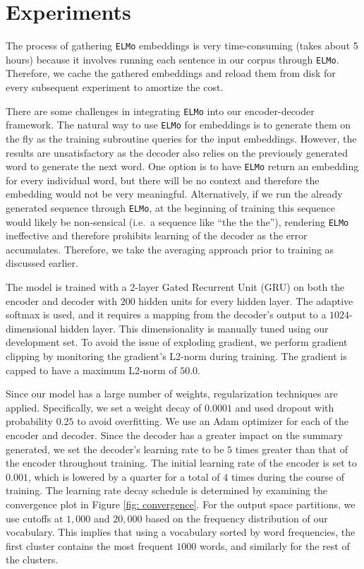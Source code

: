 \section{Experiments}
\label{sec: exp}

The process of gathering \texttt{ELMo} embeddings is very time-consuming (takes about 5 hours) because it involves running each sentence in our corpus through \texttt{ELMo}. Therefore, we cache the gathered embeddings and reload them from disk for every subsequent experiment to amortize the cost. 

There are some challenges in integrating \texttt{ELMo} into our encoder-decoder framework. The natural way to use \texttt{ELMo} for embeddings is to generate them on the fly as the training subroutine queries for the input embeddings. However, the results are unsatisfactory as the decoder also relies on the previously generated word to generate the next word. One option is to have \texttt{ELMo} return an embedding for every individual word, but there will be no context and therefore the embedding would not be very meaningful. Alternatively, if we run the already generated sequence through \texttt{ELMo}, at the beginning of training this sequence would likely be non-sensical (i.e.\ a sequence like ``the the the''), rendering \texttt{ELMo} ineffective and therefore prohibits learning of the decoder as the error accumulates. Therefore, we take the averaging approach prior to training as discussed earlier.

The model is trained with a 2-layer Gated Recurrent Unit (GRU) on both the encoder and decoder with $200$ hidden units for every hidden layer. The adaptive softmax is used, and it requires a mapping from the decoder's output to a $1024$-dimensional hidden layer. This dimensionality is manually tuned using our development set. To avoid the issue of exploding gradient, we perform gradient clipping by monitoring the gradient's L2-norm during training. The gradient is capped to have a maximum L2-norm of $50.0$.

Since our model has a large number of weights, regularization techniques are applied. Specifically, we set a weight decay of $0.0001$ and used dropout with probability $0.25$ to avoid overfitting. We use an Adam optimizer \cite{kingma2014adam} for each of the encoder and decoder. Since the decoder has a greater impact on the summary generated, we set the decoder's learning rate to be $5$ times greater than that of the encoder throughout training. The initial learning rate of the encoder is set to $0.001$, which is lowered by a quarter for a total of $4$ times during the course of training. The learning rate decay schedule is determined by examining the convergence plot in Figure \ref{fig: convergence}. For the output space partitions, we use cutoffs at $1,000$ and $20,000$ based on the frequency distribution of our vocabulary. This implies that using a vocabulary sorted by word frequencies, the first cluster contains the most frequent $1000$ words, and similarly for the rest of the clusters.


